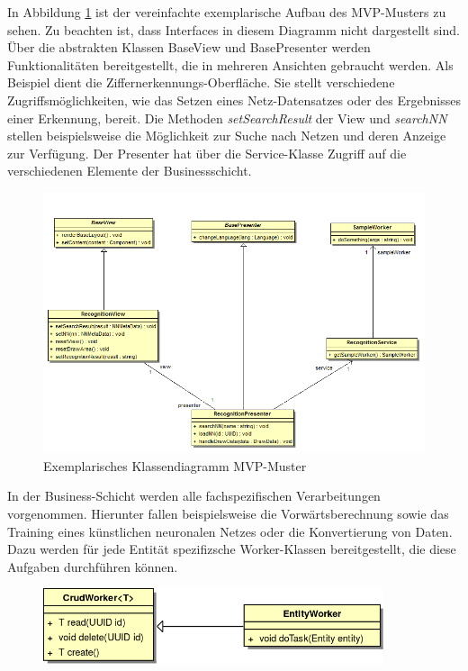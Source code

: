 In Abbildung \ref{mvp-exemplarisch} ist der vereinfachte exemplarische Aufbau des MVP-Musters zu sehen. Zu beachten ist, dass Interfaces in diesem Diagramm nicht dargestellt sind. Über die abstrakten Klassen BaseView und BasePresenter werden Funktionalitäten bereitgestellt, die in mehreren Ansichten gebraucht werden. Als Beispiel dient die Ziffernerkennungs-Oberfläche. Sie stellt verschiedene Zugriffsmöglichkeiten, wie das Setzen eines Netz-Datensatzes oder des Ergebnisses einer Erkennung, bereit. Die Methoden \textit{setSearchResult} der View und \textit{searchNN} stellen beispielsweise die Möglichkeit zur Suche nach Netzen und deren Anzeige zur Verfügung. Der Presenter hat über die Service-Klasse Zugriff auf die verschiedenen Elemente der Businessschicht. 

\begin{figure}[H]
	\centering
	\includegraphics[width=1\textwidth]{Abbildungen/UML/daniel/Klassendiagramm-MVP.png}
	\caption{Exemplarisches Klassendiagramm MVP-Muster}
	\label{mvp-exemplarisch}
\end{figure}


In der Business-Schicht werden alle fachspezifischen Verarbeitungen vorgenommen. Hierunter fallen beispielsweise die Vorwärtsberechnung sowie das Training eines künstlichen neuronalen Netzes oder die Konvertierung von Daten. Dazu werden für jede Entität spezifizsche Worker-Klassen bereitgestellt, die diese Aufgaben durchführen können.

\begin{figure}[H]
\begin{center}
\includegraphics[width=10cm]{Abbildungen/UML/jan/workerClassDiagramm.png}
\end{center}
\end{figure}

